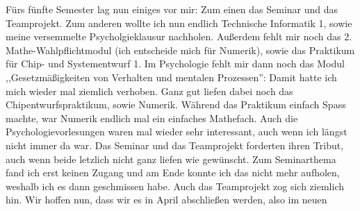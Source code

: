 
Fürs fünfte Semester lag nun einiges vor mir: Zum einen das Seminar
und das Teamprojekt. Zum anderen wollte ich nun 
endlich Technische Informatik 1, sowie meine versemmelte Psycholgieklausur nachholen. Außerdem fehlt mir
noch das 2. Mathe-Wahlpflichtmodul (ich entscheide mich für Numerik), sowie  das Praktikum für Chip-
und Systementwurf 1. Im Psychologie fehlt mir dann noch das Modul ,,Gesetzmäßigkeiten von Verhalten und mentalen Prozessen'':
Damit hatte ich mich wieder mal ziemlich verhoben. Ganz gut liefen
dabei noch das Chipentwurfspraktikum, sowie Numerik. Während das
Praktikum einfach Spass machte, war Numerik endlich mal ein einfaches
Mathefach. Auch die Psychologievorlesungen waren mal wieder sehr
interessant, auch wenn ich längst nicht immer da war.  Das Seminar und
das Teamprojekt forderten ihren Tribut, auch wenn beide letzlich nicht
ganz liefen wie gewünscht. Zum Seminarthema fand ich erst keinen
Zugang und am Ende konnte ich das nicht mehr aufholen, weshalb ich es
dann geschmissen habe. Auch das Teamprojekt zog sich ziemlich hin. Wir
hoffen nun, dass wir es in April abschließen werden, also im neuen
